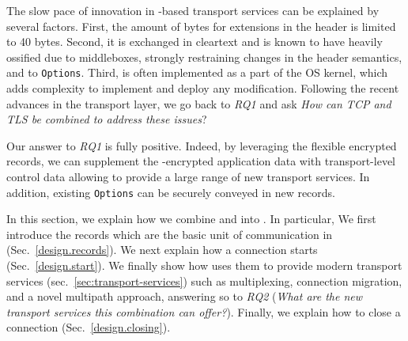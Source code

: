 


The slow pace of innovation in \tcp-based transport services can be explained by
several factors. First, the amount of bytes for extensions in the \tcp header is
limited to 40 bytes. Second, it is exchanged in cleartext and is known to have
heavily ossified due to middleboxes, strongly restraining changes in the header
semantics, and to \tcp \texttt{Options}. Third, \tcp is often implemented as a 
part of the OS kernel, which adds complexity to implement and deploy any 
modification.
Following the recent advances in the transport layer, we go back to
{\small{\textit{RQ1}}} and ask \textit{How can TCP and TLS be combined to address these issues}?

Our answer to {\small{\textit{RQ1}}} is fully positive. Indeed, by leveraging the flexible encrypted \tls records, we can supplement the \tls-encrypted application data with transport-level control data allowing \tcpls to provide a large range of new transport services. In addition, existing \tcp \texttt{Options} can be securely conveyed in new \tls records. %


In this section, we explain how we combine \tcp and \tls into \tcpls. In particular, We first introduce the \tcpls records which are the basic unit of communication in \tcpls (Sec.~\ref{design.records}).  We next explain how a \tcpls connection starts (Sec.~\ref{design.start}). We finally show
how \tcpls uses them to provide modern transport services (sec.~\ref{sec:transport-services}) such as multiplexing, connection migration, and a novel multipath approach, answering so to {\small{\textit{RQ2}}} (\textit{What are the new transport services this combination can offer?}).  Finally, we explain how to close a \tcpls connection (Sec.~\ref{design.closing}).



